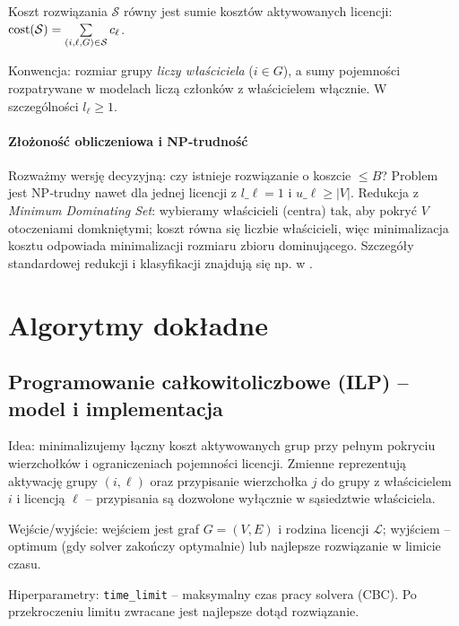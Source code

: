 \begin{definition}
Koszt rozwiązania $\mathcal{S}$ równy jest sumie kosztów aktywowanych licencji: $\operatorname{cost}(\mathcal{S})=\sum\limits_{(i,\ell,G)\in\mathcal{S}} c_\ell$.
\end{definition}

Konwencja: rozmiar grupy \emph{liczy właściciela} ($i\in G$), a sumy pojemności rozpatrywane w modelach liczą członków z właścicielem włącznie. W szczególności $l_\ell\ge 1$.

\paragraph{Złożoność obliczeniowa i NP‑trudność}
Rozważmy wersję decyzyjną: czy istnieje rozwiązanie o koszcie $\le B$? Problem jest NP‑trudny nawet dla jednej licencji z $l\_\ell=1$ i $u\_\ell\ge |V|$. Redukcja z \emph{Minimum Dominating Set}: wybieramy właścicieli (centra) tak, aby pokryć $V$ otoczeniami domkniętymi; koszt równa się liczbie właścicieli, więc minimalizacja kosztu odpowiada minimalizacji rozmiaru zbioru dominującego. Szczegóły standardowej redukcji i klasyfikacji znajdują się np. w \cite{garey1979,karp1972}.

\section{Algorytmy dokładne}

\subsection{Programowanie całkowitoliczbowe (ILP) – model i implementacja}\label{subsec:ilp}

Idea: minimalizujemy łączny koszt aktywowanych grup przy pełnym pokryciu wierzchołków i ograniczeniach pojemności licencji. Zmienne reprezentują aktywację grupy $(i,\ell)$ oraz przypisanie wierzchołka $j$ do grupy z właścicielem $i$ i licencją $\ell$ – przypisania są dozwolone wyłącznie w sąsiedztwie właściciela.

Wejście/wyjście: wejściem jest graf $G=(V,E)$ i rodzina licencji $\mathcal{L}$; wyjściem – optimum (gdy solver zakończy optymalnie) lub najlepsze rozwiązanie w limicie czasu.

Hiperparametry: \texttt{time\_limit} – maksymalny czas pracy solvera (CBC). Po przekroczeniu limitu zwracane jest najlepsze dotąd rozwiązanie.


